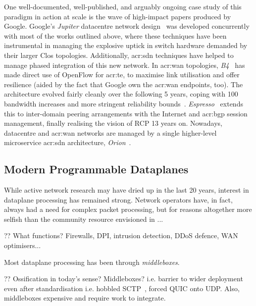 One well-documented, well-published, and arguably ongoing case study of this paradigm in action at scale is the wave of high-impact papers produced by Google.
Google's \emph{Jupiter} datacentre network design~\parencite{DBLP:conf/sigcomm/SinghOAAABBDFGK15} was developed concurrently with most of the works outlined above, where these techniques have been instrumental in managing the explosive uptick in switch hardware demanded by their larger Clos topologies.
Additionally, \gls{acr:sdn} techniques have helped to manage phased integration of this new network.
In \gls{acr:wan} topologies, \emph{B4}~\parencite{DBLP:conf/sigcomm/JainKMOPSVWZZZHSV13} has made direct use of OpenFlow for \gls{acr:te}, to maximise link utilisation and offer resilience (aided by the fact that Google own the \gls{acr:wan} endpoints, too).
The architecture evolved fairly cleanly over the following 5 years, coping with \qty{100}{\times} bandwidth increases and more stringent reliability bounds~\parencite{DBLP:conf/sigcomm/HongMAZABBJKLMP18}.
\emph{Espresso}~\parencite{DBLP:conf/sigcomm/YapMRPHBHKNJLRR17} extends this to inter-domain peering arrangements with the Internet and \gls{acr:bgp} session management, finally realising the vision of RCP 13 years on.
Nowadays, datacentre and \gls{acr:wan} networks are managed by a single higher-level microservice \gls{acr:sdn} architecture, \emph{Orion}~\parencite{DBLP:conf/nsdi/FergusonGHKMMOP21}.

\subsection{Modern Programmable Dataplanes}\label{sec:modern-pdps}
While active network research may have dried up in the last 20 years, interest in dataplane processing has remained strong.
Network operators have, in fact, always had a need for complex packet processing, but for reasons altogether more selfish than the community resource envisioned in ...

?? What functions? Firewalls, DPI, intrusion detection, DDoS defence, WAN optimisers...

Most dataplane processing has been through \emph{middleboxes}.

?? Ossification in today's sense? Middleboxes? i.e. barrier to wider deployment even after standardisation i.e. hobbled SCTP~\parencite{rfc4960}, forced QUIC onto UDP. Also, middleboxes expensive and require work to integrate.


